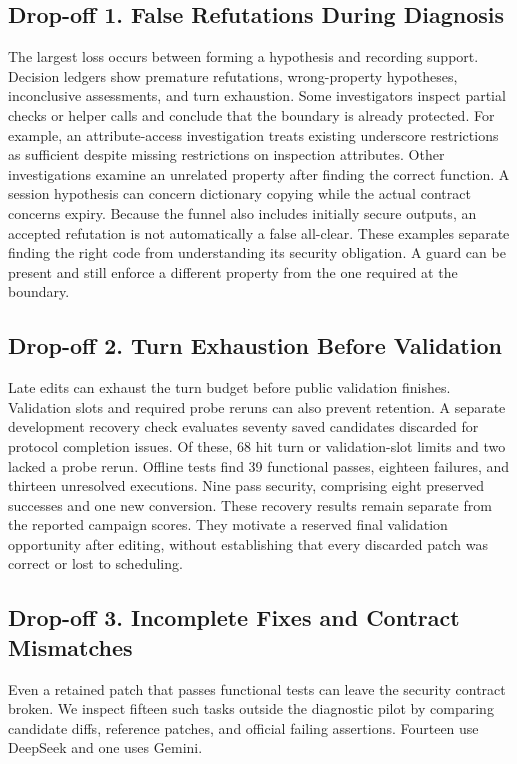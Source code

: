 \subsection{Drop-off 1. False Refutations During Diagnosis}
The largest loss occurs between forming a hypothesis and recording support. Decision ledgers show premature refutations, wrong-property hypotheses, inconclusive assessments, and turn exhaustion. Some investigators inspect partial checks or helper calls and conclude that the boundary is already protected. For example, an attribute-access investigation treats existing underscore restrictions as sufficient despite missing restrictions on inspection attributes. Other investigations examine an unrelated property after finding the correct function. A session hypothesis can concern dictionary copying while the actual contract concerns expiry. Because the funnel also includes initially secure outputs, an accepted refutation is not automatically a false all-clear.
These examples separate finding the right code from understanding its security obligation. A guard can be present and still enforce a different property from the one required at the boundary.

\subsection{Drop-off 2. Turn Exhaustion Before Validation}
Late edits can exhaust the turn budget before public validation finishes. Validation slots and required probe reruns can also prevent retention. A separate development recovery check evaluates seventy saved candidates discarded for protocol completion issues. Of these, 68 hit turn or validation-slot limits and two lacked a probe rerun. Offline tests find 39 functional passes, eighteen failures, and thirteen unresolved executions. Nine pass security, comprising eight preserved successes and one new conversion. These recovery results remain separate from the reported campaign scores. They motivate a reserved final validation opportunity after editing, without establishing that every discarded patch was correct or lost to scheduling.

\subsection{Drop-off 3. Incomplete Fixes and Contract Mismatches}
\begin{table}[t]
\caption{Manual inspection of fifteen retained patches with reference-symbol edits, verified functional passes, and failed security tests. Categories describe this selected diagnostic sample.}
\label{tab:taxonomy}
\centering\footnotesize

\end{table}
Even a retained patch that passes functional tests can leave the security contract broken. We inspect fifteen such tasks outside the diagnostic pilot by comparing candidate diffs, reference patches, and official failing assertions. Fourteen use DeepSeek and one uses Gemini.

